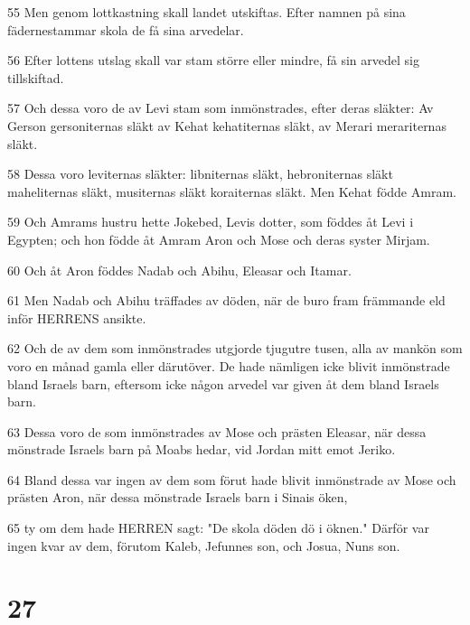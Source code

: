 \par 55 Men genom lottkastning skall landet utskiftas. Efter namnen på sina fädernestammar skola de få sina arvedelar.
\par 56 Efter lottens utslag skall var stam större eller mindre, få sin arvedel sig tillskiftad.
\par 57 Och dessa voro de av Levi stam som inmönstrades, efter deras släkter: Av Gerson gersoniternas släkt av Kehat kehatiternas släkt, av Merari merariternas släkt.
\par 58 Dessa voro leviternas släkter: libniternas släkt, hebroniternas släkt maheliternas släkt, musiternas släkt koraiternas släkt. Men Kehat födde Amram.
\par 59 Och Amrams hustru hette Jokebed, Levis dotter, som föddes åt Levi i Egypten; och hon födde åt Amram Aron och Mose och deras syster Mirjam.
\par 60 Och åt Aron föddes Nadab och Abihu, Eleasar och Itamar.
\par 61 Men Nadab och Abihu träffades av döden, när de buro fram främmande eld inför HERRENS ansikte.
\par 62 Och de av dem som inmönstrades utgjorde tjugutre tusen, alla av mankön som voro en månad gamla eller därutöver. De hade nämligen icke blivit inmönstrade bland Israels barn, eftersom icke någon arvedel var given åt dem bland Israels barn.
\par 63 Dessa voro de som inmönstrades av Mose och prästen Eleasar, när dessa mönstrade Israels barn på Moabs hedar, vid Jordan mitt emot Jeriko.
\par 64 Bland dessa var ingen av dem som förut hade blivit inmönstrade av Mose och prästen Aron, när dessa mönstrade Israels barn i Sinais öken,
\par 65 ty om dem hade HERREN sagt: "De skola döden dö i öknen." Därför var ingen kvar av dem, förutom Kaleb, Jefunnes son, och Josua, Nuns son.

\chapter{27}

